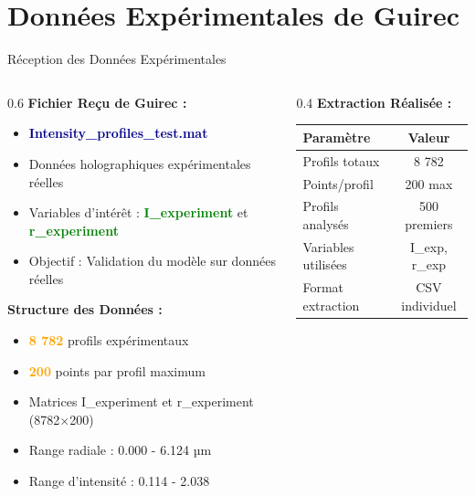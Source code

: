 \documentclass[aspectratio=169]{beamer}
\begin{document}
\section{Données Expérimentales de Guirec}

\begin{frame}{Réception des Données Expérimentales}
    \begin{columns}
        \begin{column}{0.6\textwidth}
            \textbf{Fichier Reçu de Guirec :}
            \begin{itemize}
                \item \textcolor{darkblue}{\textbf{Intensity\_profiles\_test.mat}}
                \item Données holographiques expérimentales réelles
                \item Variables d'intérêt : \textcolor{green}{\textbf{I\_experiment}} et \textcolor{green}{\textbf{r\_experiment}}
                \item Objectif : Validation du modèle sur données réelles
            \end{itemize}

            \vspace{0.3cm}
            \textbf{Structure des Données :}
            \begin{itemize}
                \item \textcolor{orange}{\textbf{8 782}} profils expérimentaux
                \item \textcolor{orange}{\textbf{200}} points par profil maximum
                \item Matrices I\_experiment et r\_experiment (8782×200)
                \item Range radiale : 0.000 - 6.124 µm
                \item Range d'intensité : 0.114 - 2.038
            \end{itemize}
        \end{column}
        \begin{column}{0.4\textwidth}
            \textbf{Extraction Réalisée :}
            \begin{table}[h]
                \centering
                \scriptsize
                \begin{tabular}{@{}lc@{}}
                    \toprule
                    \textbf{Paramètre} & \textbf{Valeur} \\
                    \midrule
                    Profils totaux & 8 782 \\
                    Points/profil & 200 max \\
                    Profils analysés & 500 premiers \\
                    Variables utilisées & I\_exp, r\_exp \\
                    Format extraction & CSV individuel \\
                    \bottomrule
                \end{tabular}
            \end{table}


\end{column}
\end{columns}
\end{frame}
\end{document}
